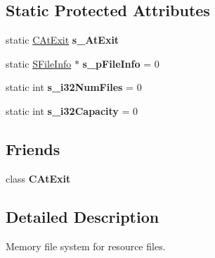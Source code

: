 \subsection*{Static Protected Attributes}
\begin{DoxyCompactItemize}
\item 
\hypertarget{class_c_p_v_r_t_memory_file_system_a5deecc2c8013631b2feadf651de87e7a}{static \hyperlink{class_c_p_v_r_t_memory_file_system_1_1_c_at_exit}{C\+At\+Exit} {\bfseries s\+\_\+\+At\+Exit}}\label{class_c_p_v_r_t_memory_file_system_a5deecc2c8013631b2feadf651de87e7a}

\item 
\hypertarget{class_c_p_v_r_t_memory_file_system_a0bf3948fa5c2a200328bdac908529b7b}{static \hyperlink{struct_c_p_v_r_t_memory_file_system_1_1_s_file_info}{S\+File\+Info} $\ast$ {\bfseries s\+\_\+p\+File\+Info} = 0}\label{class_c_p_v_r_t_memory_file_system_a0bf3948fa5c2a200328bdac908529b7b}

\item 
\hypertarget{class_c_p_v_r_t_memory_file_system_a937a8bb2b86d29859db7c0723c991f47}{static int {\bfseries s\+\_\+i32\+Num\+Files} = 0}\label{class_c_p_v_r_t_memory_file_system_a937a8bb2b86d29859db7c0723c991f47}

\item 
\hypertarget{class_c_p_v_r_t_memory_file_system_a92744c81b8661dab0a04adbb9d03e7ad}{static int {\bfseries s\+\_\+i32\+Capacity} = 0}\label{class_c_p_v_r_t_memory_file_system_a92744c81b8661dab0a04adbb9d03e7ad}

\end{DoxyCompactItemize}
\subsection*{Friends}
\begin{DoxyCompactItemize}
\item 
\hypertarget{class_c_p_v_r_t_memory_file_system_a908fc0a9478e138edabd601087e25e9c}{class {\bfseries C\+At\+Exit}}\label{class_c_p_v_r_t_memory_file_system_a908fc0a9478e138edabd601087e25e9c}

\end{DoxyCompactItemize}


\subsection{Detailed Description}
Memory file system for resource files. 



